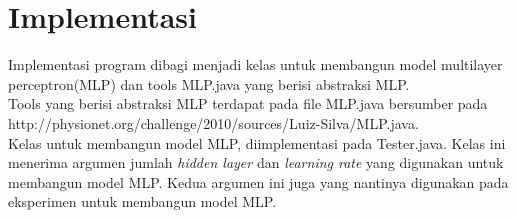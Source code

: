 \section{Implementasi}
Implementasi program dibagi menjadi kelas untuk membangun model multilayer perceptron(MLP) dan tools MLP.java yang berisi abstraksi MLP.\\ 
Tools yang berisi abstraksi MLP terdapat pada file MLP.java bersumber pada http://physionet.org/challenge/2010/sources/Luiz-Silva/MLP.java.\\
Kelas untuk membangun model MLP, diimplementasi pada Tester.java. Kelas ini menerima argumen jumlah \textit{hidden layer} dan \textit{learning rate} yang digunakan untuk membangun model MLP. Kedua argumen ini juga yang nantinya digunakan pada eksperimen untuk membangun model MLP.
\lipsum